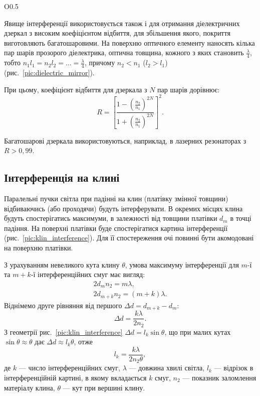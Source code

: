 \begin{wrapfigure}{O}{0.5\linewidth}\centering
	
	\caption{Діелектричне дзеркало}
	\label{pic:dielectric_mirror}
\end{wrapfigure}
Явище інтерференції використовується також і для отримання діелектричних дзеркал з високим коефіцієнтом відбиття, для збільшення якого, покриття виготовляють багатошаровими. На поверхню оптичного елементу наносять кілька пар шарів прозорого діелектрика, оптична товщина, кожного з яких становить $ \frac\lambda4 $, тобто $ n_1l_1 = n_2 l_2 = \ldots = \frac\lambda4 $, причому $ n_2 < n_1 $ ($ l_2 > l_1$) (рис.~\ref{pic:dielectric_mirror}).

При цьому, коефіцієнт відбиття для дзеркала з $ N $ пар шарів дорівнює:
\begin{equation}\label{key}
    R = \left[ \frac{1 - \left( \frac{n_2}{n_1}\right)^{2N} }{1 + \left( \frac{n_2}{n_1}\right)^{2N}} \right]^2.
\end{equation}

Багатошарові дзеркала використовуються, наприклад,  в лазерних резонаторах з $ R > 0,99 $.


\subsection*{Інтерференція на клині}


Паралельні пучки світла при падінні на клин (платівку змінної товщини) відбиваючись (або проходячи) будуть інтерферувати. В окремих місцях  клина будуть спостерігатись максимуми, в залежності від товщини платівки $d_m$ в точці падіння. На поверхні платівки буде спостерігатися картина інтерференції (рис.~\ref{pic:klin_interference}). Для її спостереження очі повинні бути акомодовані на поверхню платівки.

З урахуванням невеликого кута клину $\theta$, умова максимуму інтерференції
для $m$-ї та $m + k$-ї інтерференційних смуг має вигляд:
\begin{align*}\label{}
	2d_m n_2 = m\lambda, \\
	2d_{m + k}n_2 = (m + k)\lambda.
\end{align*}
Віднімемо друге рівняння від першого $\Delta d = d_{m + k} - d_m $:
\begin{equation*}
	\Delta d = \frac{k\lambda}{2n_2}.
\end{equation*}
З геометрії рис.~\ref{pic:klin_interference} $\Delta d = l_k \sin\theta$, що при малих кутах $\sin\theta \approx \theta$ дає  $\Delta d \approx l_k \theta$, отже
\begin{equation}\label{eq:Klin_interference}
	l_k = \frac{k\lambda}{2n_2\theta},
\end{equation}
де $k$ --- число інтерференційних смуг, $\lambda$ --- довжина хвилі світла, $l_k$ --- відрізок в інтерференційній картині, в якому вкладається $k$ смуг, $n_2$ --- показник заломлення матеріалу клина, $\theta$ --- кут при вершині клину.


